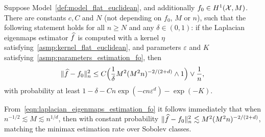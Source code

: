 \begin{theorem}
	\label{thm:laplacian_eigenmaps_estimation_fo}
	Suppose Model~\ref{def:model_flat_euclidean}, and additionally $f_0 \in H^1(\mathcal{X},M)$. There are constants $c,C$ and $N$ (not depending on $f_0$, $M$ or $n$), such that the following statement holds for all $n \geq N$ and any $\delta \in (0,1)$: if the Laplacian eigenmaps estimator $\widehat{f}$ is computed with a kernel $\eta$ satisfying~\ref{asmp:kernel_flat_euclidean}, and parameters $\varepsilon$ and $K$ satisfying~\ref{asmp:parameters_estimation_fo}, then
	\begin{equation}
	\label{eqn:laplacian_eigenmaps_estimation_fo}
	\|\widehat{f} - f_0\|_n^2 \leq C\Bigl(\frac{1}{\delta}M^2(M^2n)^{-2/(2 + d)} \wedge 1\Bigr) \vee \frac{1}{n},
	\end{equation}
	with probability at least $1 - \delta - Cn\exp(-cn\varepsilon^d) - \exp(-K)$.
\end{theorem}
From~\eqref{eqn:laplacian_eigenmaps_estimation_fo} it follows immediately that when $n^{-1/2} \lesssim M \lesssim n^{1/d}$, then with constant probability $\|\widehat{f} - f_0\|_n^2 \lesssim M^2(M^2n)^{-2/(2 + d)}$, matching the minimax estimation rate over Sobolev classes.

